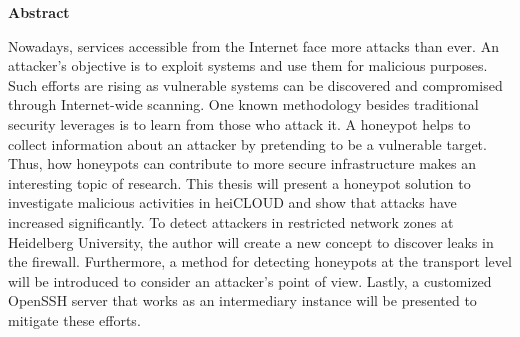 \thispagestyle{empty}
\begin{center}
    \begin{minipage}[c][0.48\textheight][b]{0.9\textwidth}
        \small
        \begin{center}
            \textbf{Abstract}
        \end{center}\par
        \vspace{\baselineskip}
        Nowadays, services accessible from the Internet face more attacks than ever.
        An attacker's objective is to exploit systems and use them for malicious purposes.
        Such efforts are rising as vulnerable systems can be discovered and compromised through Internet-wide scanning.
        One known methodology besides traditional security leverages is to learn from those who attack it.
        A honeypot helps to collect information about an attacker by pretending to be a vulnerable target.
        Thus, how honeypots can contribute to more secure infrastructure makes an interesting topic of research.
        This thesis will present a honeypot solution to investigate malicious activities in heiCLOUD and show that attacks have increased significantly.
        To detect attackers in restricted network zones at Heidelberg University, the author will create a new concept to discover leaks in the firewall.
        Furthermore, a method for detecting honeypots at the transport level will be introduced to consider an attacker's point of view.
        Lastly, a customized OpenSSH server that works as an intermediary instance will be presented to mitigate these efforts.
        \end{minipage}\par
    \vfill
\end{center}